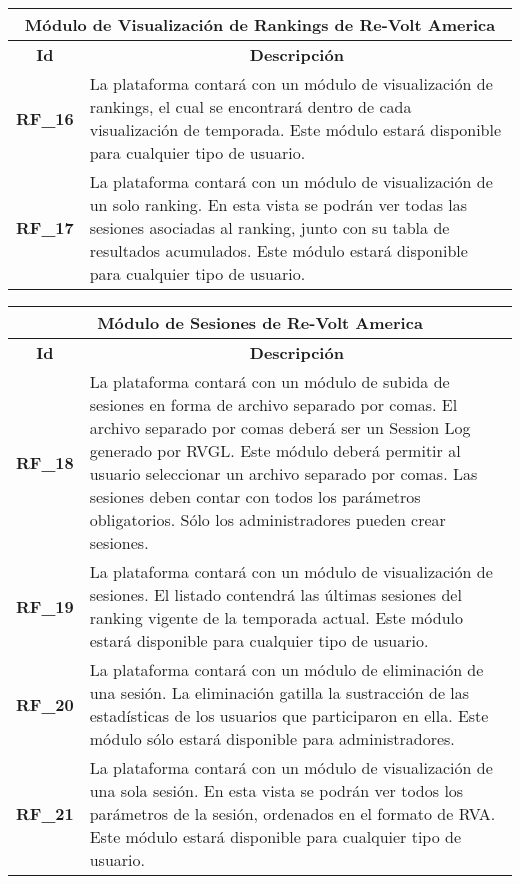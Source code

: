 \begin{center}
	\begin{tabular}{ | l | p{15cm} |}
		\hline
		\multicolumn{2}{|c|}{\textbf{Módulo de Visualización de Rankings de Re-Volt America}} \\
		\hline
		\multicolumn{1}{|c|}{\textbf{Id}} & \multicolumn{1}{|c|}{\textbf{Descripción}} \\
		\hline
		
		{\textbf{RF\_16}} & La plataforma contará con un módulo de visualización de rankings, el cual se encontrará dentro de cada visualización de temporada. Este módulo estará disponible para cualquier tipo de usuario. \\ \hline
		
		{\textbf{RF\_17}} & La plataforma contará con un módulo de visualización de un solo ranking. En esta vista se podrán ver todas las sesiones asociadas al ranking, junto con su tabla de resultados acumulados. Este módulo estará disponible para cualquier tipo de usuario. \\ \hline
	\end{tabular}
\end{center}

\begin{center}
	\begin{tabular}{ | l | p{15cm} |}
		\hline
		\multicolumn{2}{|c|}{\textbf{Módulo de Sesiones de Re-Volt America}} \\
		\hline
		\multicolumn{1}{|c|}{\textbf{Id}} & \multicolumn{1}{|c|}{\textbf{Descripción}} \\
		\hline
		{\textbf{RF\_18}} & La plataforma contará con un módulo de subida de sesiones en forma de archivo separado por comas. El archivo separado por comas deberá ser un Session Log generado por RVGL. Este módulo deberá permitir al usuario seleccionar un archivo separado por comas. Las sesiones deben contar con todos los parámetros obligatorios. Sólo los administradores pueden crear sesiones. \\ \hline
		
		{\textbf{RF\_19}} & La plataforma contará con un módulo de visualización de sesiones. El listado contendrá las últimas sesiones del ranking vigente de la temporada actual. Este módulo estará disponible para cualquier tipo de usuario. \\ \hline
		
		{\textbf{RF\_20}} & La plataforma contará con un módulo de eliminación de una sesión. La eliminación gatilla la sustracción de las estadísticas de los usuarios que participaron en ella. Este módulo sólo estará disponible para administradores. \\ \hline
		
		{\textbf{RF\_21}} & La plataforma contará con un módulo de visualización de una sola sesión. En esta vista se podrán ver todos los parámetros de la sesión, ordenados en el formato de RVA. Este módulo estará disponible para cualquier tipo de usuario. \\ \hline
	\end{tabular}
\end{center}

